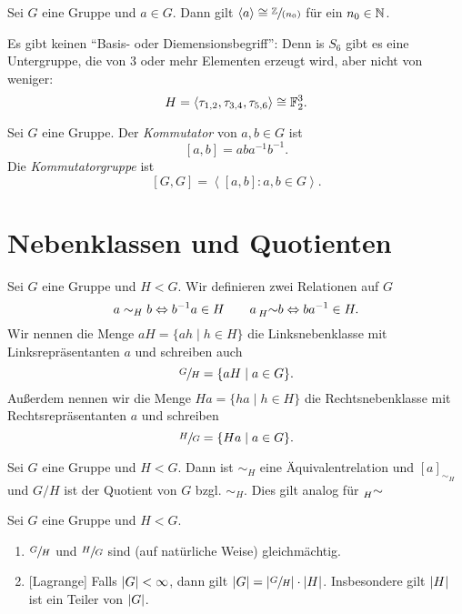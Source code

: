 \begin{lemma}
	Sei $G$ eine Gruppe und $a \in G$. Dann gilt $\left< a \right> \cong \sfrac{\mathbb{Z}}{(n_0)}$ für ein $n_0 \in \mathbb{N}$.
\end{lemma}



\begin{remark}
	Es gibt keinen \enquote{Basis- oder Diemensionsbegriff}:
	Denn is $S_{6}$ gibt es eine Untergruppe, die von $3$ oder mehr Elementen erzeugt wird, aber nicht von weniger:
	\[
	H = \left< \tau_{1,2}, \tau_{3,4}, \tau_{5,6} \right> \cong \mathbb{F}_{2}^{3}
	.\] 
\end{remark}

\begin{definition}
	Sei $G$ eine Gruppe. Der \emph{Kommutator} von $a,b \in G$ ist 
	\[
		[a,b] = ab a^{-1} b^{-1}
	.\]
	Die \emph{Kommutatorgruppe} ist
	\[
		[G,G] = \left< [a,b]: a,b \in G \right>
	.\] 
\end{definition}

\section{Nebenklassen und Quotienten}

\begin{definition}
	Sei $G$ eine Gruppe und $H < G$.
	Wir definieren zwei Relationen auf $G$ 
	\[
		a \sim_{H} b \Leftrightarrow b^{-1} a \in H \qquad a \prescript{}{H}{\sim} b \Leftrightarrow b a^{-1} \in H
	.\] 
	Wir nennen die Menge $a H = \{a h \mid h \in H\} $ die Linksnebenklasse mit Linksrepräsentanten $a$ und schreiben auch
	\[
	\sfrac{G}{H} = \{a H \mid a \in G\} 
	.\] 
	Außerdem nennen wir die Menge $H a = \{h a \mid h \in H\} $ die Rechtsnebenklasse mit Rechtsrepräsentanten $a$ und schreiben 
	\[
	\sfrac{H}{G} = \{H a \mid a \in G\} 
	.\] 
\end{definition}

\begin{lemma}
	Sei $G$ eine Gruppe und $H < G$. Dann ist $\sim_{H}$ eine Äquivalentrelation und $[ a ]_{\sim_{H}}$ und $G / H$ ist der Quotient von $G$ bzgl. $\sim_{H}$.
	Dies gilt analog für $\prescript{}{H}{\sim}$
\end{lemma}



\begin{theorem}
	Sei $G$ eine Gruppe und $H < G$.
	\begin{enumerate}[(1)]
		\item $\sfrac{G}{H}$ und $\sfrac{H}{G}$ sind (auf natürliche Weise) gleichmächtig.
		\item {[Lagrange]} Falls $\abs{G} < \infty$, dann gilt $\abs{G} = \abs{\sfrac{G}{H}} \cdot \abs{H}$.
			Insbesondere gilt $\abs{H}$ ist ein Teiler von $\abs{G}$.
	\end{enumerate}
\end{theorem}

